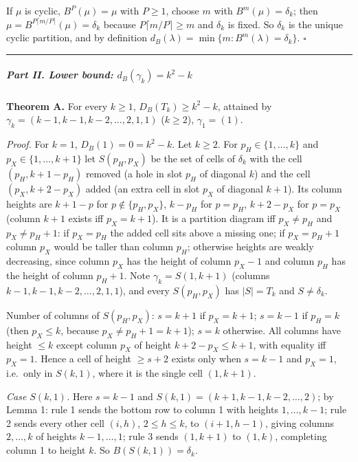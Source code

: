 If \(\mu\) is cyclic, \(B^P(\mu)=\mu\) with \(P\ge1\), choose \(m\) with
\(B^m(\mu)=\delta_k\); then \(\mu=B^{P\lceil m/P\rceil}(\mu)=\delta_k\)
because \(P\lceil m/P\rceil\ge m\) and \(\delta_k\) is fixed. So
\(\delta_k\) is the unique cyclic partition, and by definition
\(d_B(\lambda)=\min\{m:B^m(\lambda)=\delta_k\}\). \(\square\)

\begin{center}\rule{0.5\linewidth}{0.5pt}\end{center}

\subparagraph{\texorpdfstring{Part II. Lower bound:
\(d_B(\gamma_k)=k^2-k\)}{Part II. Lower bound: d\_B(\textbackslash gamma\_k)=k\^{}2-k}}\label{part-ii.-lower-bound-d_bgamma_kk2-k}

\textbf{Theorem A.} For every \(k\ge1\), \(D_B(T_k)\ge k^2-k\), attained
by \(\gamma_k=(k-1,k-1,k-2,\dots,2,1,1)\) (\(k\ge2\)), \(\gamma_1=(1)\).

\emph{Proof.} For \(k=1\), \(D_B(1)=0=k^2-k\). Let \(k\ge2\). For
\(p_H\in\{1,\dots,k\}\) and \(p_X\in\{1,\dots,k+1\}\) let \(S(p_H,p_X)\)
be the set of cells of \(\delta_k\) with the cell \((p_H,k+1-p_H)\)
removed (a hole in slot \(p_H\) of diagonal \(k\)) and the cell
\((p_X,k+2-p_X)\) added (an extra cell in slot \(p_X\) of diagonal
\(k+1\)). Its column heights are \(k+1-p\) for \(p\notin\{p_H,p_X\}\),
\(k-p_H\) for \(p=p_H\), \(k+2-p_X\) for \(p=p_X\) (column \(k+1\)
exists iff \(p_X=k+1\)). It is a partition diagram iff \(p_X\ne p_H\)
and \(p_X\ne p_H+1\): if \(p_X=p_H\) the added cell sits above a missing
one; if \(p_X=p_H+1\) column \(p_X\) would be taller than column
\(p_H\); otherwise heights are weakly decreasing, since column \(p_X\)
has the height of column \(p_X-1\) and column \(p_H\) has the height of
column \(p_H+1\). Note \(\gamma_k=S(1,k+1)\) (columns
\(k-1,k-1,k-2,\dots,2,1,1\)), and every \(S(p_H,p_X)\) has \(|S|=T_k\)
and \(S\ne\delta_k\).

Number of columns of \(S(p_H,p_X)\): \(s=k+1\) if \(p_X=k+1\); \(s=k-1\)
if \(p_H=k\) (then \(p_X\le k\), because \(p_X\ne p_H+1=k+1\)); \(s=k\)
otherwise. All columns have height \(\le k\) except column \(p_X\) of
height \(k+2-p_X\le k+1\), with equality iff \(p_X=1\). Hence a cell of
height \(\ge s+2\) exists only when \(s=k-1\) and \(p_X=1\), i.e.~only
in \(S(k,1)\), where it is the single cell \((1,k+1)\).

\emph{Case \(S(k,1)\).} Here \(s=k-1\) and
\(S(k,1)=(k+1,k-1,k-2,\dots,2)\); by Lemma 1: rule 1 sends the bottom
row to column 1 with heights \(1,\dots,k-1\); rule 2 sends every other
cell \((i,h)\), \(2\le h\le k\), to \((i+1,h-1)\), giving columns
\(2,\dots,k\) of heights \(k-1,\dots,1\); rule 3 sends \((1,k+1)\) to
\((1,k)\), completing column 1 to height \(k\). So
\(B(S(k,1))=\delta_k\).

